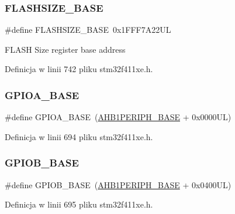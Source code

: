 \subsubsection{\texorpdfstring{F\+L\+A\+S\+H\+S\+I\+Z\+E\+\_\+\+B\+A\+SE}{FLASHSIZE\_BASE}}
{\footnotesize\ttfamily \#define F\+L\+A\+S\+H\+S\+I\+Z\+E\+\_\+\+B\+A\+SE~0x1\+F\+F\+F7\+A22\+UL}

F\+L\+A\+SH Size register base address 

Definicja w linii 742 pliku stm32f411xe.\+h.

\mbox{\label{group___peripheral__memory__map_gad7723846cc5db8e43a44d78cf21f6efa}} 
\subsubsection{\texorpdfstring{G\+P\+I\+O\+A\+\_\+\+B\+A\+SE}{GPIOA\_BASE}}
{\footnotesize\ttfamily \#define G\+P\+I\+O\+A\+\_\+\+B\+A\+SE~(\hyperlink{group___peripheral__memory__map_ga811a9a4ca17f0a50354a9169541d56c4}{A\+H\+B1\+P\+E\+R\+I\+P\+H\+\_\+\+B\+A\+SE} + 0x0000\+U\+L)}



Definicja w linii 694 pliku stm32f411xe.\+h.

\mbox{\label{group___peripheral__memory__map_gac944a89eb789000ece920c0f89cb6a68}} 
\subsubsection{\texorpdfstring{G\+P\+I\+O\+B\+\_\+\+B\+A\+SE}{GPIOB\_BASE}}
{\footnotesize\ttfamily \#define G\+P\+I\+O\+B\+\_\+\+B\+A\+SE~(\hyperlink{group___peripheral__memory__map_ga811a9a4ca17f0a50354a9169541d56c4}{A\+H\+B1\+P\+E\+R\+I\+P\+H\+\_\+\+B\+A\+SE} + 0x0400\+U\+L)}



Definicja w linii 695 pliku stm32f411xe.\+h.

